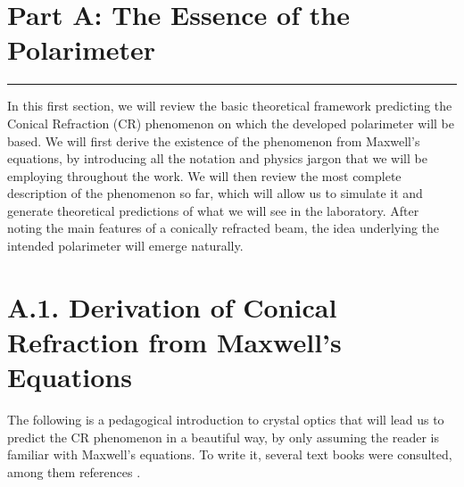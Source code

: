 \documentclass[11pt, a4paper, twoside]{article} %
\begin{document}
\newpage

\newpage


\newpage
\clearpage
\newpage

\section*{\centering \huge{Part A: The Essence of the Polarimeter}\vspace{-0.4cm}}
\noindent\rule{\textwidth}{0.4pt}
\vspace{-0.4cm}

In this first section, we will review the basic theoretical framework predicting the Conical Refraction (CR) phenomenon on which the developed polarimeter will be based. We will first derive the existence of the phenomenon from Maxwell's equations, by introducing all the notation and physics jargon that we will be employing throughout the work. We will then review the most complete description of the phenomenon so far, which will allow us to simulate it and generate theoretical predictions of what we will see in the laboratory. After noting the main features of a conically refracted beam, the idea underlying the intended polarimeter will emerge naturally.\vspace{-0.2cm}

\section*{A.1. Derivation of Conical Refraction from Maxwell's Equations\vspace{-0.2cm}}
The following is a pedagogical introduction to crystal optics that will lead us to predict the CR phenomenon in a beautiful way, by only assuming the reader is familiar with Maxwell's equations. To write it, several text books were consulted, among them references \cite{LL,magnetostatic,fundamentals}.\vspace{-0.3cm}
\end{document}
